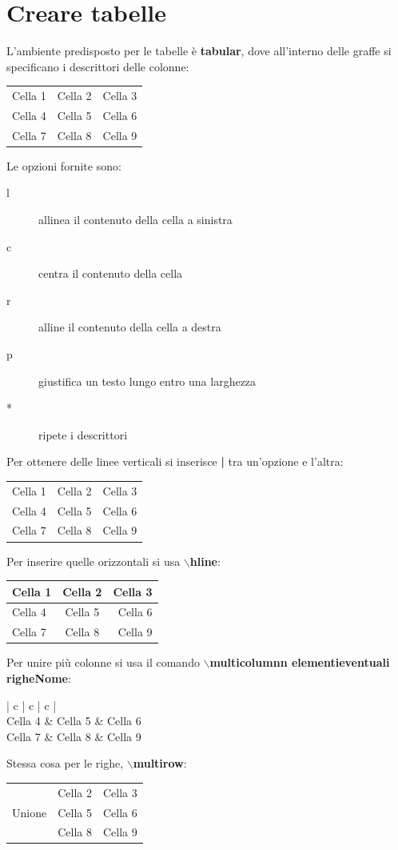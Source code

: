 \documentclass[a4paper, 12pt]{book}
\theoremstyle{plain}
\begin{document}
	\section{Creare tabelle}
	L'ambiente predisposto per le tabelle è \textbf{tabular}, 
	dove all'interno delle graffe si specificano i descrittori delle colonne:
	\begin{center}
		\begin{tabular}{l c r}
			Cella 1 & Cella 2 & Cella 3\\
			Cella 4 & Cella 5 & Cella 6\\
			Cella 7 & Cella 8 & Cella 9\\
		\end{tabular}
	\end{center}
	Le opzioni fornite sono:
	\begin{description}
		\item[l] allinea il contenuto della cella a sinistra
		\item[c] centra il contenuto della cella
		\item[r] alline il contenuto della cella a destra
		\item[p] giustifica un testo lungo entro una larghezza
		\item[*] ripete i descrittori  
	\end{description}
	Per ottenere delle linee verticali si inserisce \textbf{|} tra 
	un'opzione e l'altra:
	\begin{center}
		\begin{tabular}{l | c | r}
			Cella 1 & Cella 2 & Cella 3\\
			Cella 4 & Cella 5 & Cella 6\\
			Cella 7 & Cella 8 & Cella 9\\
		\end{tabular}
	\end{center}
	Per inserire quelle orizzontali si usa \textbf{$\backslash$hline}:
	\begin{center}
		\begin{tabular}{l c r}
			\hline
			Cella 1 & Cella 2 & Cella 3\\
			\hline
			Cella 4 & Cella 5 & Cella 6\\
			\hline
			Cella 7 & Cella 8 & Cella 9\\
			\hline
		\end{tabular}
	\end{center}
	Per unire più colonne si usa il comando \textbf{$\backslash$multicolumn{n elementi}{eventuali righe}{Nome}}:
	\begin{center}
		\begin{tabular}{| c | c | c |}
			\hline
			\\
			\hline
			Cella 4 & Cella 5 & Cella 6\\
			\hline
			Cella 7 & Cella 8 & Cella 9\\
			\hline
		\end{tabular}
	\end{center}
	Stessa cosa per le righe, \textbf{$\backslash$multirow}:
	\begin{center}
		\begin{tabular}{| c | c | c |}
			\hline
			\multirow{3}{4em}{Unione} & Cella 2 & Cella 3\\
			& Cella 5 & Cella 6\\
			& Cella 8 & Cella 9\\
			\hline
		\end{tabular}
	\end{center} 
	
	
	
\end{document}
